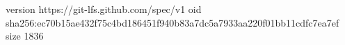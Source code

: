 version https://git-lfs.github.com/spec/v1
oid sha256:ec70b15ae432f75c4bd186451f940b83a7dc5a7933aa220f01bb11cdfc7ea7ef
size 1836
